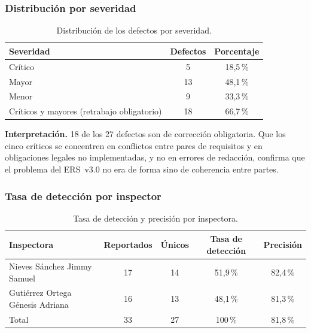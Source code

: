 \documentclass[journal,onecolumn]{IEEEtran}
\begin{document}
	\subsubsection{Distribución por severidad}
	
	\begin{table}[h!]
		\centering
		\caption{Distribución de los defectos por severidad.}
		\label{tab:distribucion-severidad}
		\begin{tabular}{l c c}
			\toprule
			\textbf{Severidad} & \textbf{Defectos} & \textbf{Porcentaje} \\
			\midrule
			Crítico & 5  & 18,5\,\% \\
			Mayor   & 13 & 48,1\,\% \\
			Menor   & 9  & 33,3\,\% \\
			\midrule
			Críticos y mayores (retrabajo obligatorio) & 18 & 66,7\,\% \\
			\bottomrule
		\end{tabular}
	\end{table}
	
	\textbf{Interpretación.} 18 de los 27 defectos son de corrección
	obligatoria. Que los cinco críticos se concentren en conflictos entre pares
	de requisitos y en obligaciones legales no implementadas, y no en errores de
	redacción, confirma que el problema del ERS~v3.0 no era de forma sino de
	coherencia entre partes.
	
	\subsubsection{Tasa de detección por inspector}
	
	\begin{table}[h!]
		\centering
		\caption{Tasa de detección y precisión por inspectora.}
		\label{tab:tasa-deteccion}
		\begin{tabular}{
				>{\raggedright\arraybackslash}p{4.3cm}
				c c c c
			}
			\toprule
			\textbf{Inspectora} & \textbf{Reportados} & \textbf{Únicos} & \textbf{Tasa de detección} & \textbf{Precisión} \\
			\midrule
			Nieves Sánchez Jimmy Samuel & 17 & 14 & 51,9\,\% & 82,4\,\% \\
			Gutiérrez Ortega Génesis Adriana & 16 & 13 & 48,1\,\% & 81,3\,\% \\
			\addlinespace
			\midrule
			Total & 33 & 27 & 100\,\% & 81,8\,\% \\
			\bottomrule
		\end{tabular}
	\end{table}
	
\end{document}
